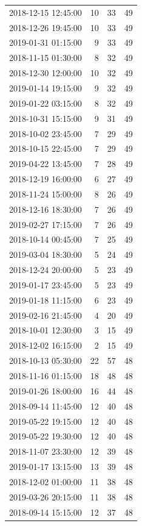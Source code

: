 \begin{tabular}{lrrr}
2018-12-15 12:45:00 & 10 & 33 & 49 \\
2018-12-26 19:45:00 & 10 & 33 & 49 \\
2019-01-31 01:15:00 & 9 & 33 & 49 \\
2018-11-15 01:30:00 & 8 & 32 & 49 \\
2018-12-30 12:00:00 & 10 & 32 & 49 \\
2019-01-14 19:15:00 & 9 & 32 & 49 \\
2019-01-22 03:15:00 & 8 & 32 & 49 \\
2018-10-31 15:15:00 & 9 & 31 & 49 \\
2018-10-02 23:45:00 & 7 & 29 & 49 \\
2018-10-15 22:45:00 & 7 & 29 & 49 \\
2019-04-22 13:45:00 & 7 & 28 & 49 \\
2018-12-19 16:00:00 & 6 & 27 & 49 \\
2018-11-24 15:00:00 & 8 & 26 & 49 \\
2018-12-16 18:30:00 & 7 & 26 & 49 \\
2019-02-27 17:15:00 & 7 & 26 & 49 \\
2018-10-14 00:45:00 & 7 & 25 & 49 \\
2019-03-04 18:30:00 & 5 & 24 & 49 \\
2018-12-24 20:00:00 & 5 & 23 & 49 \\
2019-01-17 23:45:00 & 5 & 23 & 49 \\
2019-01-18 11:15:00 & 6 & 23 & 49 \\
2019-02-16 21:45:00 & 4 & 20 & 49 \\
2018-10-01 12:30:00 & 3 & 15 & 49 \\
2018-12-02 16:15:00 & 2 & 15 & 49 \\
2018-10-13 05:30:00 & 22 & 57 & 48 \\
2018-11-16 01:15:00 & 18 & 48 & 48 \\
2019-01-26 18:00:00 & 16 & 44 & 48 \\
2018-09-14 11:45:00 & 12 & 40 & 48 \\
2019-05-22 19:15:00 & 12 & 40 & 48 \\
2019-05-22 19:30:00 & 12 & 40 & 48 \\
2018-11-07 23:30:00 & 12 & 39 & 48 \\
2019-01-17 13:15:00 & 13 & 39 & 48 \\
2018-12-02 01:00:00 & 11 & 38 & 48 \\
2019-03-26 20:15:00 & 11 & 38 & 48 \\
2018-09-14 15:15:00 & 12 & 37 & 48 \\

\end{tabular}
